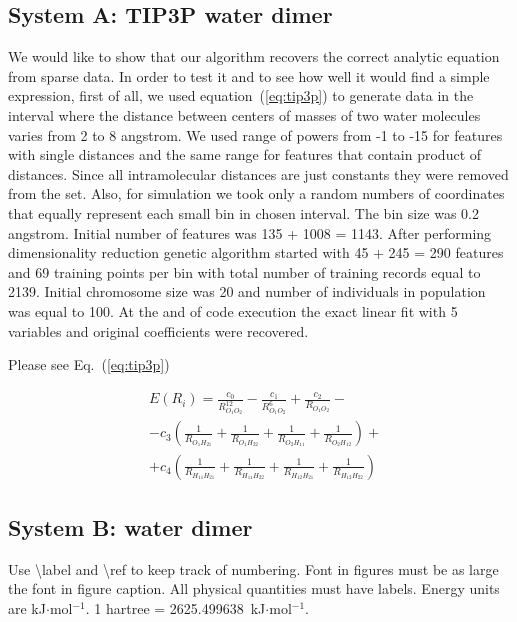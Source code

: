 \documentclass[aps,prl,reprint,amsmath,amssymb,nature]{revtex4-1}
\begin{document}
\subsection{System A: TIP3P water dimer}

We would like to show that our algorithm recovers the correct analytic equation from sparse data. In order to test it and to see how well it would find a simple expression, first of all, we used equation~(\ref{eq:tip3p}) to generate data in the interval where the distance between centers of masses of two water molecules varies from 2 to 8 angstrom. We used range of powers from -1 to -15 for features with single distances and the same range for features that contain product of distances. Since all intramolecular distances are just constants they were removed from the set. Also, for simulation we took only a random numbers of coordinates that equally represent each small bin in chosen interval. The bin size was 0.2 angstrom. Initial number of features was 135 + 1008 = 1143. After performing dimensionality reduction genetic algorithm started with 45 + 245 = 290 features and 69 training points per bin with total number of training records equal to  2139. Initial chromosome size was 20 and number of individuals in population was equal to 100. At the and of code execution the exact linear fit with 5 variables and original coefficients were recovered.

Please see Eq.~(\ref{eq:tip3p})

\begin{eqnarray} \label{eq:tip3p}
&E(R_i) = \frac{c_0}{R_{O_1O_2}^{12}}-\frac{c_1}{R_{O_1O_2}^6} + \frac{c_2}{R_{O_1O_2}} - \nonumber
\\
& - c_3(\frac{1}{R_{O_1H_{21}}}+\frac{1}{R_{O_1H_{22}}}+\frac{1}{R_{O_2H_{11}}}+\frac{1}{R_{O_2H_{12}}}) + \nonumber
\\
& + c_4(\frac{1}{R_{H_{11}H_{21}}}+\frac{1}{R_{H_{11}H_{22}}}+\frac{1}{R_{H_{12}H_{21}}}+\frac{1}{R_{H_{12}H_{22}}})
\end{eqnarray}

\subsection{System B: water dimer}

\red Use {\textbackslash}label and {\textbackslash}ref to keep track of numbering. Font in figures must be as large the font in figure caption.  All physical quantities must have labels. Energy units are kJ$\cdot$mol$^{-1}$. 1 hartree = 2625.499638~kJ$\cdot$mol$^{-1}$. \old
\end{document}
